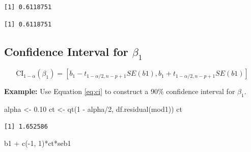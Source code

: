 \documentclass[
]{article}
\newenvironment{Shaded}{\begin{snugshade}}{\end{snugshade}}
\newcommand{\CommentTok}[1]{\textcolor[rgb]{0.56,0.35,0.01}{\textit{#1}}}
\newcommand{\DecValTok}[1]{\textcolor[rgb]{0.00,0.00,0.81}{#1}}
\newcommand{\FloatTok}[1]{\textcolor[rgb]{0.00,0.00,0.81}{#1}}
\newcommand{\FunctionTok}[1]{\textcolor[rgb]{0.00,0.00,0.00}{#1}}
\newcommand{\NormalTok}[1]{#1}
\newcommand{\OtherTok}[1]{\textcolor[rgb]{0.56,0.35,0.01}{#1}}
\newcommand{\SpecialCharTok}[1]{\textcolor[rgb]{0.00,0.00,0.00}{#1}}
\begin{document}
\begin{verbatim}
[1] 0.6118751
\end{verbatim}

\begin{Shaded}
\end{Shaded}

\begin{verbatim}
[1] 0.6118751
\end{verbatim}

\hypertarget{confidence-interval-for-beta_1}{%
\subsection{\texorpdfstring{Confidence Interval for \(\beta_1\)}{Confidence Interval for \textbackslash beta\_1}}\label{confidence-interval-for-beta_1}}

\begin{equation}
\text{CI}_{1 - \alpha}(\beta_1) = \left[b_1 - t_{1- \alpha/2, n - p + 1}SE(b1), b_1 + t_{1- \alpha/2, n - p + 1}SE(b1) \right]
\label{eq:ci}
\end{equation}

\textbf{Example:} Use Equation \eqref{eq:ci} to construct a 90\% confidence interval for \(\beta_1\).

\begin{Shaded}
\begin{Highlighting}[]
\NormalTok{alpha }\OtherTok{\textless{}{-}} \FloatTok{0.10}
\NormalTok{ct }\OtherTok{\textless{}{-}} \FunctionTok{qt}\NormalTok{(}\DecValTok{1} \SpecialCharTok{{-}}\NormalTok{ alpha}\SpecialCharTok{/}\DecValTok{2}\NormalTok{, }\FunctionTok{df.residual}\NormalTok{(mod1))}
\NormalTok{ct}
\end{Highlighting}
\end{Shaded}

\begin{verbatim}
[1] 1.652586
\end{verbatim}

\begin{Shaded}
\begin{Highlighting}[]
\NormalTok{b1 }\SpecialCharTok{+} \FunctionTok{c}\NormalTok{(}\SpecialCharTok{{-}}\DecValTok{1}\NormalTok{, }\DecValTok{1}\NormalTok{)}\SpecialCharTok{*}\NormalTok{ct}\SpecialCharTok{*}\NormalTok{seb1}
\end{Highlighting}
\end{Shaded}
\end{document}
